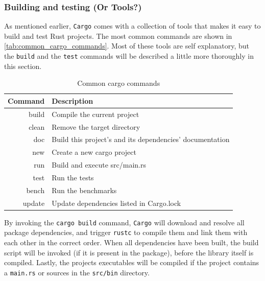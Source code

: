 \subsubsection{Building and testing (Or Tools?)}

As mentioned earlier, \texttt{Cargo} comes with a collection of tools that makes it easy to build and test Rust projects.
The most common commands are shown in \autoref{tab:common_cargo_commands}.
Most of these tools are self explanatory, but the \texttt{build} and the \texttt{test} commands will be described a little more thoroughly in this section.

\begin{table}[ht]
\begin{center}
\begin{tabular}{r|l}
\textbf{Command} & \textbf{Description}                           \\
\hline
build  & Compile the current project                              \\
clean  & Remove the target directory                              \\
doc    & Build this project's and its dependencies' documentation \\
new    & Create a new cargo project                               \\
run    & Build and execute src/main.rs                            \\
test   & Run the tests                                            \\
bench  & Run the benchmarks                                       \\
update & Update dependencies listed in Cargo.lock                 \\
\hline
\end{tabular}
\caption{Common cargo commands}
\label{tab:common_cargo_commands}
\end{center}
\end{table}

By invoking the \texttt{cargo build} command, \texttt{Cargo} will download and resolve all package dependencies, and trigger \texttt{rustc} to compile them and link them with each other in the correct order.
When all dependencies have been built, the build script will be invoked (if it is present in the package), before the library itself is compiled.
Lastly, the projects executables will be compiled if the project contains a \texttt{main.rs} or sources in the \texttt{src/bin} directory.

